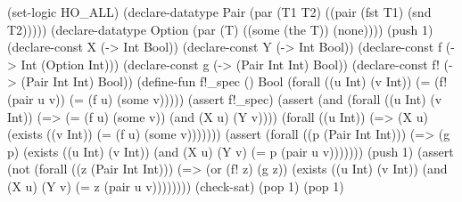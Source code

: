 \FloatBarrier
\begingroup
{}
\begin{smtlisting}[title={Complete running-example refutation.}, label=lst:beer-running-po]
(set-logic HO_ALL)
(declare-datatype Pair (par (T1 T2) ((pair (fst T1) (snd T2)))))
(declare-datatype Option (par (T) ((some (the T)) (none))))
(push 1)
  (declare-const X (-> Int Bool))
  (declare-const Y (-> Int Bool))
  (declare-const f (-> Int (Option Int)))
  (declare-const g (-> (Pair Int Int) Bool))
  (declare-const f! (-> (Pair Int Int) Bool))
  (define-fun f!_spec () Bool
    (forall ((u Int) (v Int))
      (= (f! (pair u v)) (= (f u) (some v)))))
  (assert f!_spec)
  (assert
    (and
      (forall ((u Int) (v Int))
        (=> (= (f u) (some v)) (and (X u) (Y v))))
      (forall ((u Int))
        (=> (X u) (exists ((v Int)) (= (f u) (some v)))))))
  (assert
    (forall ((p (Pair Int Int)))
      (=> (g p)
        (exists ((u Int) (v Int))
          (and (X u) (Y v) (= p (pair u v)))))))
  (push 1)
    (assert
      (not
        (forall ((z (Pair Int Int)))
          (=> (or (f! z) (g z))
            (exists ((u Int) (v Int))
              (and (X u) (Y v) (= z (pair u v))))))))
    (check-sat)
  (pop 1)
(pop 1)
\end{smtlisting}
\endgroup
